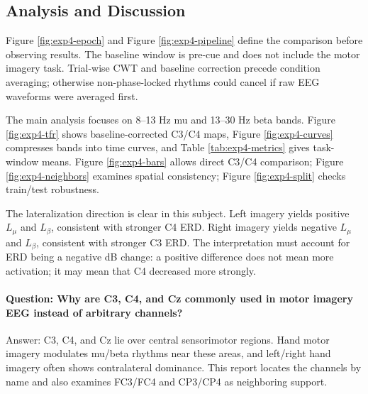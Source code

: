 \documentclass[a4paper,11pt]{article}
\numberwithin{equation}{section}
\begin{document}
\begin{table}[H]
\centering
\caption{C3-C4 lateralization metrics and expected interpretation.}
\label{tab:exp4-lat}
\scriptsize
{}
\end{table}


\subsection{Analysis and Discussion}
Figure \ref{fig:exp4-epoch} and Figure \ref{fig:exp4-pipeline} define the comparison before observing results. The baseline window is pre-cue and does not include the motor imagery task. Trial-wise CWT and baseline correction precede condition averaging; otherwise non-phase-locked rhythms could cancel if raw EEG waveforms were averaged first.

The main analysis focuses on 8--13 Hz mu and 13--30 Hz beta bands. Figure \ref{fig:exp4-tfr} shows baseline-corrected C3/C4 maps, Figure \ref{fig:exp4-curves} compresses bands into time curves, and Table \ref{tab:exp4-metrics} gives task-window means. Figure \ref{fig:exp4-bars} allows direct C3/C4 comparison; Figure \ref{fig:exp4-neighbors} examines spatial consistency; Figure \ref{fig:exp4-split} checks train/test robustness.

The lateralization direction is clear in this subject. Left imagery yields positive $L_\mu$ and $L_\beta$, consistent with stronger C4 ERD. Right imagery yields negative $L_\mu$ and $L_\beta$, consistent with stronger C3 ERD. The interpretation must account for ERD being a negative dB change: a positive difference does not mean more activation; it may mean that C4 decreased more strongly.

\paragraph{Question: Why are C3, C4, and Cz commonly used in motor imagery EEG instead of arbitrary channels?}
Answer: C3, C4, and Cz lie over central sensorimotor regions. Hand motor imagery modulates mu/beta rhythms near these areas, and left/right hand imagery often shows contralateral dominance. This report locates the channels by name and also examines FC3/FC4 and CP3/CP4 as neighboring support.
\end{document}
